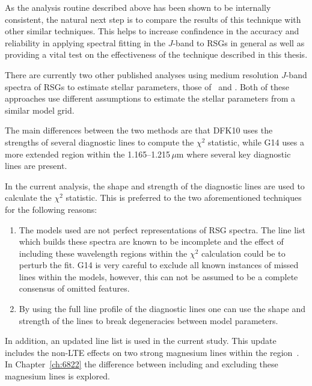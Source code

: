As the analysis routine described above has been shown to be internally consistent, the natural next step is to compare the results of this technique with other similar techniques.
This helps to increase confindence in the accuracy and reliability in applying spectral fitting in the $J$-band to RSGs in general as well as providing a vital test on the effectiveness of the technique described in this thesis.

There are currently two other published analyses using medium resolution $J$-band spectra of RSGs to estimate stellar parameters,
those of~\cite[][DFK10]{2010MNRAS.407.1203D} and
\cite[][G14]{2014PhDT.........G}.
Both of these approaches use different assumptions to estimate the stellar parameters from a similar model grid.

The main differences between the two methods are that DFK10 uses the strengths of several diagnostic lines to compute the $\chi^{2}$ statistic,
while G14 uses a more extended region within the 1.165--1.215\,$\mu$m where several key diagnostic lines are present.

In the current analysis, the shape and strength of the diagnostic lines are used to calculate the $\chi^{2}$ statistic.
This is preferred to the two aforementioned techniques for the following reasons:

\begin{enumerate}
    \item The models used are not perfect representations of RSG spectra.
    The line list which builds these spectra are known to be incomplete and the effect of including these wavelength regions within the $\chi^{2}$ calculation could be to perturb the fit. G14 is very careful to exclude all known instances of missed lines within the models, however, this can not be assumed to be a complete consensus of omitted features.

    \item By using the full line profile of the diagnostic lines one can use the shape and strength of the lines to break degeneracies between model parameters.

\end{enumerate}

In addition, an updated line list is used in the current study.
This update includes the non-LTE effects on two strong magnesium lines within the region~\citep{2015ApJ...804..113B}.
In Chapter~\ref{ch:6822} the difference between including and excluding these magnesium lines is explored.


